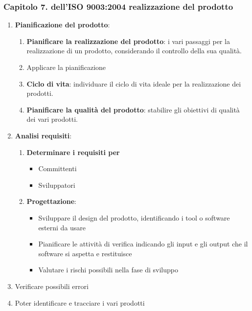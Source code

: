     \subsubsection{Capitolo 7. dell'ISO 9003:2004 realizzazione del prodotto}
    
    \begin{enumerate}
        \item \textbf{Pianificazione del prodotto}:
            \begin{enumerate}
                \item \textbf{Pianificare la realizzazione del prodotto}: i vari passaggi per la realizzazione di un prodotto, considerando il controllo della sua qualità.
                \item Applicare la pianificazione
                \item \textbf{Ciclo di vita}: individuare il ciclo di vita ideale per la realizzazione dei prodotti.
                \item \textbf{Pianificare la qualità del prodotto}: stabilire gli obiettivi di qualità dei vari prodotti.
            \end{enumerate}
        \item \textbf{Analisi requisiti}:
            \begin{enumerate}
                \item \textbf{Determinare i requisiti per}
                    \begin{itemize}
                        \item Committenti
                        \item Sviluppatori
                    \end{itemize}
                \item \textbf{Progettazione}:
                    \begin{itemize}
                        \item Sviluppare il design del prodotto, identificando i tool o software esterni da usare
                        \item Pianificare le attività di verifica indicando gli input e gli output che il software si aspetta e restituisce
                        \item Valutare i rischi possibili nella fase di sviluppo
                    \end{itemize}
            \end{enumerate}
        \item Verificare possibili errori
        \item Poter identificare e tracciare i vari prodotti
    \end{enumerate}
